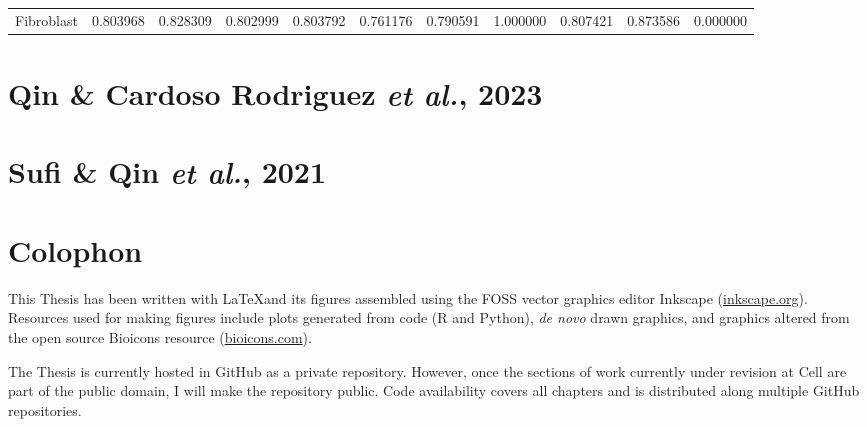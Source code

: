 \begin{table}
\begin{tabular}{lrrrrrrrrrr}
        Fibroblast & {\cellcolor[HTML]{FCA60C}} \color[HTML]{000000} 0.803968 & {\cellcolor[HTML]{FCB418}} \color[HTML]{000000} 0.828309 & {\cellcolor[HTML]{FCA60C}} \color[HTML]{000000} 0.802999 & {\cellcolor[HTML]{FCA60C}} \color[HTML]{000000} 0.803792 & {\cellcolor[HTML]{FA9207}} \color[HTML]{000000} 0.761176 & {\cellcolor[HTML]{FCA108}} \color[HTML]{000000} 0.790591 & {\cellcolor[HTML]{FCFFA4}} \color[HTML]{000000} 1.000000 & {\cellcolor[HTML]{FCA80D}} \color[HTML]{000000} 0.807421 & {\cellcolor[HTML]{F9C932}} \color[HTML]{000000} 0.873586 & {\cellcolor[HTML]{000004}} \color[HTML]{F1F1F1} 0.000000 \\
    \end{tabular}

\end{table}


\chapter{Qin \& Cardoso Rodriguez \emph{et al.}, 2023}
\label{appendix:qincardoso}



\chapter{Sufi \& Qin \emph{et al.}, 2021}
\label{appendix:sufiqin}




\chapter{Colophon}
\label{appendix:colophon}

This Thesis has been written with \LaTeX and its figures assembled using the FOSS vector graphics editor Inkscape (\url{inkscape.org}). Resources used for making figures include plots generated from code (R and Python), \emph{de novo} drawn graphics, and graphics altered from the open source Bioicons resource (\url{bioicons.com}). 

The Thesis is currently hosted in GitHub as a private repository. However, once the sections of work currently under revision at Cell are part of the public domain, I will make the repository public. Code availability covers all chapters and is distributed along multiple GitHub repositories.

